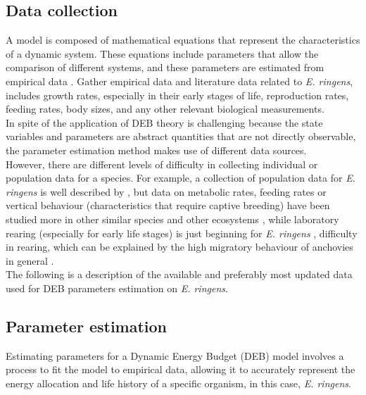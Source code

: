 \subsection{Data collection}\label{Chap4MethDat}

A model is composed of mathematical equations that represent the characteristics of a dynamic system. These equations include parameters that allow the comparison of different systems, and these parameters are estimated from empirical data \citep{RaolGiri2004}. Gather empirical data and literature data related to \textit{E. ringens}, includes growth rates, especially in their early stages of life, reproduction rates, feeding rates, body sizes, and any other relevant biological measurements.\\

In spite of the application of DEB theory is challenging because the state variables and parameters are abstract quantities that are not directly observable, the parameter estimation method \citep{Lika2011a,Lika2011b} makes use of different data sources.\\

However, there are different levels of difficulty in collecting individual or population data for a species. For example, a collection of population data for \textit{E. ringens} is well described by \citep{MarzShin2009}, but data on metabolic rates, feeding rates or vertical behaviour (characteristics that require captive breeding) have been studied more in other similar species and other ecosystems \citep{AldaCota2008,CermUria2003,KramZwei1968,DetwHoud1970,Hunt1971,Hunt1984,SakaKimu1976,Houd1977,MethKram1979,Thei1980,Brow1983}, while laboratory rearing (especially for early life stages) is just beginning for \textit{E. ringens} \citep{RiouOfel2021,OfelMoya2023}, difficulty in rearing, which can be explained by the high migratory behaviour of anchovies in general \citep{OlivSala2001,MoraBaba2010,TanaOhsh2010,PoliHure2015,GuraFach2017,CastNiqu2021}.\\

The following is a description of the available and preferably most updated data used for DEB parameters estimation on \textit{E. ringens}.\\

\subsection{Parameter estimation}

Estimating parameters for a Dynamic Energy Budget (DEB) model involves a process to fit the model to empirical data, allowing it to accurately represent the energy allocation and life history of a specific organism, in this case, \textit{E. ringens}.\\

